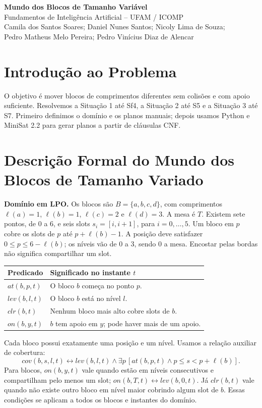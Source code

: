 \documentclass[11pt,a4paper]{article}
\begin{document}
\begin{center}
{\Large\bfseries Mundo dos Blocos de Tamanho Variável}\\[5pt]
Fundamentos de Inteligência Artificial -- UFAM / ICOMP\\[6pt]
Camila dos Santos Soares; Daniel Nunes Santos; Nicoly Lima de Souza;\\
Pedro Matheus Melo Pereira; Pedro Vinícius Diaz de Alencar
\end{center}

\section{Introdução ao Problema}
O objetivo é mover blocos de comprimentos diferentes sem colisões e com apoio suficiente. Resolvemos a Situação 1 até Sf4, a Situação 2 até S5 e a Situação 3 até S7. Primeiro definimos o domínio e os planos manuais; depois usamos Python e MiniSat 2.2 para gerar planos a partir de cláusulas CNF.

\section{Descrição Formal do Mundo dos Blocos de Tamanho Variado}
\textbf{Domínio em LPO.} Os blocos são $B=\{a,b,c,d\}$, com comprimentos $\ell(a)=1$, $\ell(b)=1$, $\ell(c)=2$ e $\ell(d)=3$. A mesa é $T$. Existem sete pontos, de 0 a 6, e seis slots $s_i=[i,i+1]$, para $i=0,\ldots,5$. Um bloco em $p$ cobre os slots de $p$ até $p+\ell(b)-1$. A posição deve satisfazer $0\leq p\leq6-\ell(b)$; os níveis vão de 0 a 3, sendo 0 a mesa. Encostar pelas bordas não significa compartilhar um slot.

\begin{tabularx}{\linewidth}{lY}
\toprule Predicado & Significado no instante $t$ \\ \midrule
$at(b,p,t)$ & O bloco $b$ começa no ponto $p$.\\
$lev(b,l,t)$ & O bloco $b$ está no nível $l$.\\
$clr(b,t)$ & Nenhum bloco mais alto cobre slots de $b$.\\
$on(b,y,t)$ & $b$ tem apoio em $y$; pode haver mais de um apoio.\\ \bottomrule
\end{tabularx}

Cada bloco possui exatamente uma posição e um nível. Usamos a relação auxiliar de cobertura:
\[cov(b,s,l,t)\leftrightarrow lev(b,l,t)\land\exists p\,[at(b,p,t)\land p\leq s<p+\ell(b)].\]
Para blocos, $on(b,y,t)$ vale quando estão em níveis consecutivos e compartilham pelo menos um slot; $on(b,T,t)\leftrightarrow lev(b,0,t)$. Já $clr(b,t)$ vale quando não existe outro bloco em nível maior cobrindo algum slot de $b$. Essas condições se aplicam a todos os blocos e instantes do domínio.
\end{document}
